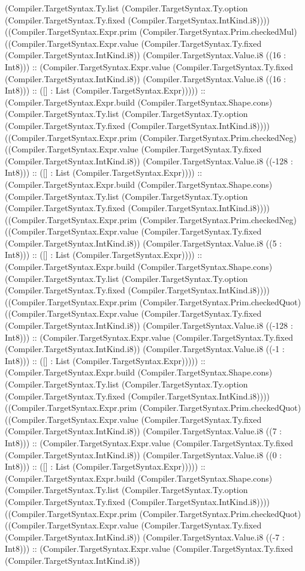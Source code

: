 \documentclass[11pt]{article}
\begin{document}
(Compiler.TargetSyntax.Ty.list (Compiler.TargetSyntax.Ty.option (Compiler.TargetSyntax.Ty.fixed (Compiler.TargetSyntax.IntKind.i8)))) ((Compiler.TargetSyntax.Expr.prim (Compiler.TargetSyntax.Prim.checkedMul) ((Compiler.TargetSyntax.Expr.value (Compiler.TargetSyntax.Ty.fixed (Compiler.TargetSyntax.IntKind.i8)) (Compiler.TargetSyntax.Value.i8 ((16 : Int8))) :: (Compiler.TargetSyntax.Expr.value (Compiler.TargetSyntax.Ty.fixed (Compiler.TargetSyntax.IntKind.i8)) (Compiler.TargetSyntax.Value.i8 ((16 : Int8))) :: ([] : List (Compiler.TargetSyntax.Expr))))) :: (Compiler.TargetSyntax.Expr.build (Compiler.TargetSyntax.Shape.cons) (Compiler.TargetSyntax.Ty.list (Compiler.TargetSyntax.Ty.option (Compiler.TargetSyntax.Ty.fixed (Compiler.TargetSyntax.IntKind.i8)))) ((Compiler.TargetSyntax.Expr.prim (Compiler.TargetSyntax.Prim.checkedNeg) ((Compiler.TargetSyntax.Expr.value (Compiler.TargetSyntax.Ty.fixed (Compiler.TargetSyntax.IntKind.i8)) (Compiler.TargetSyntax.Value.i8 ((-128 : Int8))) :: ([] : List (Compiler.TargetSyntax.Expr)))) :: (Compiler.TargetSyntax.Expr.build (Compiler.TargetSyntax.Shape.cons) (Compiler.TargetSyntax.Ty.list (Compiler.TargetSyntax.Ty.option (Compiler.TargetSyntax.Ty.fixed (Compiler.TargetSyntax.IntKind.i8)))) ((Compiler.TargetSyntax.Expr.prim (Compiler.TargetSyntax.Prim.checkedNeg) ((Compiler.TargetSyntax.Expr.value (Compiler.TargetSyntax.Ty.fixed (Compiler.TargetSyntax.IntKind.i8)) (Compiler.TargetSyntax.Value.i8 ((5 : Int8))) :: ([] : List (Compiler.TargetSyntax.Expr)))) :: (Compiler.TargetSyntax.Expr.build (Compiler.TargetSyntax.Shape.cons) (Compiler.TargetSyntax.Ty.list (Compiler.TargetSyntax.Ty.option (Compiler.TargetSyntax.Ty.fixed (Compiler.TargetSyntax.IntKind.i8)))) ((Compiler.TargetSyntax.Expr.prim (Compiler.TargetSyntax.Prim.checkedQuot) ((Compiler.TargetSyntax.Expr.value (Compiler.TargetSyntax.Ty.fixed (Compiler.TargetSyntax.IntKind.i8)) (Compiler.TargetSyntax.Value.i8 ((-128 : Int8))) :: (Compiler.TargetSyntax.Expr.value (Compiler.TargetSyntax.Ty.fixed (Compiler.TargetSyntax.IntKind.i8)) (Compiler.TargetSyntax.Value.i8 ((-1 : Int8))) :: ([] : List (Compiler.TargetSyntax.Expr))))) :: (Compiler.TargetSyntax.Expr.build (Compiler.TargetSyntax.Shape.cons) (Compiler.TargetSyntax.Ty.list (Compiler.TargetSyntax.Ty.option (Compiler.TargetSyntax.Ty.fixed (Compiler.TargetSyntax.IntKind.i8)))) ((Compiler.TargetSyntax.Expr.prim (Compiler.TargetSyntax.Prim.checkedQuot) ((Compiler.TargetSyntax.Expr.value (Compiler.TargetSyntax.Ty.fixed (Compiler.TargetSyntax.IntKind.i8)) (Compiler.TargetSyntax.Value.i8 ((7 : Int8))) :: (Compiler.TargetSyntax.Expr.value (Compiler.TargetSyntax.Ty.fixed (Compiler.TargetSyntax.IntKind.i8)) (Compiler.TargetSyntax.Value.i8 ((0 : Int8))) :: ([] : List (Compiler.TargetSyntax.Expr))))) :: (Compiler.TargetSyntax.Expr.build (Compiler.TargetSyntax.Shape.cons) (Compiler.TargetSyntax.Ty.list (Compiler.TargetSyntax.Ty.option (Compiler.TargetSyntax.Ty.fixed (Compiler.TargetSyntax.IntKind.i8)))) ((Compiler.TargetSyntax.Expr.prim (Compiler.TargetSyntax.Prim.checkedQuot) ((Compiler.TargetSyntax.Expr.value (Compiler.TargetSyntax.Ty.fixed (Compiler.TargetSyntax.IntKind.i8)) (Compiler.TargetSyntax.Value.i8 ((-7 : Int8))) :: (Compiler.TargetSyntax.Expr.value (Compiler.TargetSyntax.Ty.fixed (Compiler.TargetSyntax.IntKind.i8)) 
\end{document}
